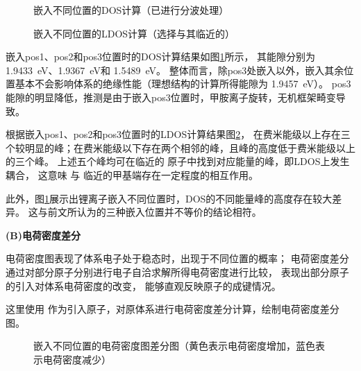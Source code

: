 \begin{figure}[htbp]
    \centering
    \caption{嵌入不同位置的DOS计算（已进行分波处理）}
    \label{fig:111-pos-dos}
\end{figure}

\begin{figure}[htbp]
    \centering
    \caption{嵌入不同位置的LDOS计算（选择与其临近的）}
    \label{fig:111-pos-ldos}
\end{figure}

嵌入pos1、pos2和pos3位置时的DOS计算结果如图\ref{fig:111-pos-dos}所示，
其能隙分别为 \SI{1.9433}{eV}、\SI{1.9367}{eV}和 \SI{1.5489}{eV}。
整体而言，除pos3处嵌入以外，嵌入其余位置基本不会影响体系的绝缘性能（理想结构的计算所得能隙为 \SI{1.9457}{eV}）。
pos3能隙的明显降低，推测是由于嵌入pos3位置时，甲胺离子旋转，无机框架畸变导致。

根据嵌入pos1、pos2和pos3位置时的LDOS计算结果图\ref{fig:111-pos-ldos}，
在费米能级以上存在三个较明显的峰；在费米能级以下存在两个相邻的峰，且峰的高度低于费米能级以上的三个峰。
上述五个峰均可在临近的 原子中找到对应能量的峰，即LDOS上发生耦合，
这意味 与 临近的甲基端存在一定程度的相互作用。

此外，图\ref{fig:111-pos-dos}展示出锂离子嵌入不同位置时，DOS的不同能量峰的高度存在较大差异。
这与前文所认为的三种嵌入位置并不等价的结论相符。

{\bf (B)电荷密度差分}

电荷密度图表现了体系电子处于稳态时，出现于不同位置的概率；
电荷密度差分通过对部分原子分别进行电子自洽求解所得电荷密度进行比较，
表现出部分原子的引入对体系电荷密度的改变，
能够直观反映原子的成键情况。

这里使用 作为引入原子，对原体系进行电荷密度差分计算，绘制电荷密度差分图。

\begin{figure}[htbp]
    \centering
    \caption{嵌入不同位置的电荷密度图差分图（黄色表示电荷密度增加，蓝色表示电荷密度减少）}
    \label{fig:111-pos-chgdiff}
\end{figure}

